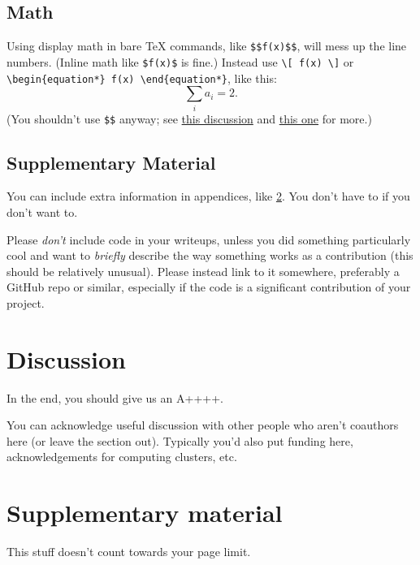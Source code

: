\documentclass{article}
\begin{document}
\subsection{Math}
Using display math in bare TeX commands, like \texttt{\$\$f(x)\$\$}, will mess up the line numbers. (Inline math like \texttt{\$f(x)\$} is fine.)
Instead use \texttt{\textbackslash [ f(x) \textbackslash ]} or \texttt{\textbackslash begin\{equation*\} f(x) \textbackslash end\{equation*\}},
like this:
\[ \sum_i a_i = 2 .\]
(You shouldn't use \texttt{\$\$} anyway; see \href{https://tex.stackexchange.com/questions/503/why-is-preferable-to}{this discussion} and \href{https://tex.stackexchange.com/questions/40492/what-are-the-differences-between-align-equation-and-displaymath}{this one} for more.)


\subsection{Supplementary Material}
You can include extra information in appendices, like \cref{app:info}.
You don't have to if you don't want to.

Please \emph{don't} include code in your writeups, unless you did something particularly cool and want to \emph{briefly} describe the way something works as a contribution (this should be relatively unusual).
Please instead link to it somewhere, preferably a GitHub repo or similar,
especially if the code is a significant contribution of your project.


\section{Discussion}
In the end, you should give us an A++++.


\begin{ack}
    You can acknowledge useful discussion with other people who aren't coauthors here (or leave the section out).
    Typically you'd also put funding here, acknowledgements for computing clusters, etc.
\end{ack}


\printbibliography



\appendix

\section{Supplementary material} \label{app:info}

This stuff doesn't count towards your page limit.
\end{document}
